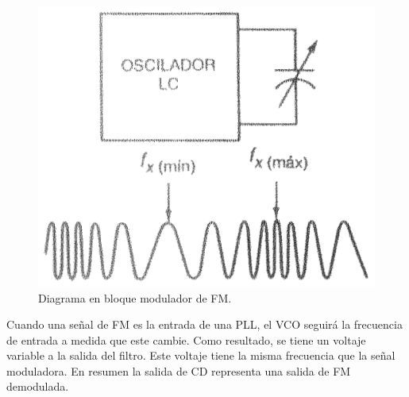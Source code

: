 \documentclass[10pt,a4paper]{IEEEtran}
\begin{document}
    \begin{figure}[H]
        \centering
        \includegraphics[scale=0.3]{sal.png}
        \caption{Diagrama en bloque modulador de FM.}
        \label{sal}
    \end{figure}
    
    Cuando una señal de FM es la entrada de una PLL, el VCO seguirá la frecuencia de entrada a medida que este cambie. Como resultado, se tiene un voltaje variable a la salida del filtro. Este voltaje tiene la misma frecuencia que la señal 
    moduladora. 
    En resumen la salida de CD representa una salida de FM demodulada.
\end{document}
